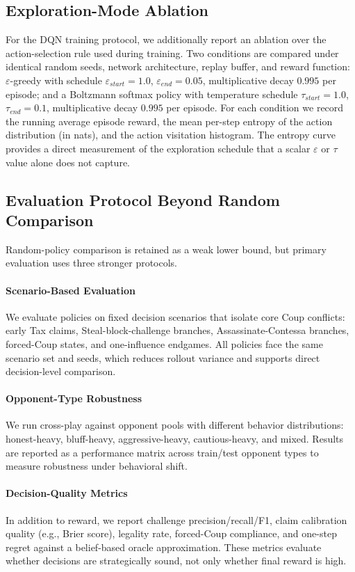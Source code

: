 \documentclass[11pt]{article}
\begin{document}
\subsection{Exploration-Mode Ablation}
  For the DQN training protocol, we additionally report an ablation over the
  action-selection rule used during training. Two conditions are compared under identical
  random seeds, network architecture, replay buffer, and reward function:
  $\varepsilon$-greedy with schedule $\varepsilon_{start}=1.0$, $\varepsilon_{end}=0.05$,
  multiplicative decay $0.995$ per episode; and a Boltzmann softmax policy with temperature
  schedule $\tau_{start}=1.0$, $\tau_{end}=0.1$, multiplicative decay $0.995$ per episode.
  For each condition we record the running average episode reward, the mean per-step entropy
   of the action distribution (in nats), and the action visitation histogram. The entropy
  curve provides a direct measurement of the exploration schedule that a scalar
  $\varepsilon$ or $\tau$ value alone does not capture.

\subsection{Evaluation Protocol Beyond Random Comparison}
Random-policy comparison is retained as a weak lower bound, but primary evaluation uses three stronger protocols.

\paragraph{Scenario-Based Evaluation}
We evaluate policies on fixed decision scenarios that isolate core Coup conflicts: early Tax claims, Steal-block-challenge branches, Assassinate-Contessa branches, forced-Coup states, and one-influence endgames. All policies face the same scenario set and seeds, which reduces rollout variance and supports direct decision-level comparison.

\paragraph{Opponent-Type Robustness}
We run cross-play against opponent pools with different behavior distributions: honest-heavy, bluff-heavy, aggressive-heavy, cautious-heavy, and mixed. Results are reported as a performance matrix across train/test opponent types to measure robustness under behavioral shift.

\paragraph{Decision-Quality Metrics}
In addition to reward, we report challenge precision/recall/F1, claim calibration quality (e.g., Brier score), legality rate, forced-Coup compliance, and one-step regret against a belief-based oracle approximation. These metrics evaluate whether decisions are strategically sound, not only whether final reward is high.
\end{document}
